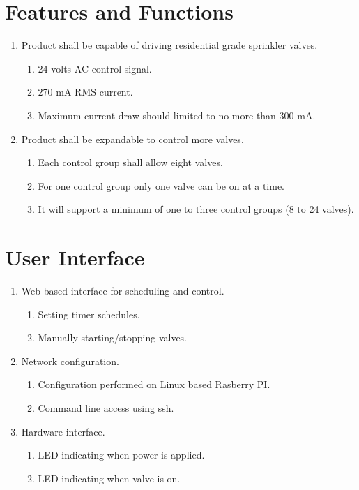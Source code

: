 \documentclass[12pt,letterpaper]{article}
\begin{document}

\pagebreak

\section{Features and Functions}

\begin{enumerate}
\item Product shall be capable of driving residential grade sprinkler valves.
	\begin{enumerate}
	\item 24 volts AC control signal.
	\item 270 mA RMS current.
	\item Maximum current draw should limited to no more than 300 mA.
	\end{enumerate}

\item Product shall be expandable to control more valves.
	\begin{enumerate}
	\item Each control group shall allow eight valves.
	\item For one control group only one valve can be on at a time.
	\item It will support a minimum of one to three control groups
		(8 to 24 valves).
	\end{enumerate}

\end{enumerate}

\section{User Interface}

\begin{enumerate}
\item Web based interface for scheduling and control.
	\begin{enumerate}
	\item Setting timer schedules.
	\item Manually starting/stopping valves.
	\end{enumerate}
\item Network configuration.
	\begin{enumerate}
	\item Configuration performed on Linux based Rasberry PI.
	\item Command line access using ssh.
	\end{enumerate}
\item Hardware interface.
	\begin{enumerate}
	\item LED indicating when power is applied.
	\item LED indicating when valve is on.
	\end{enumerate}
\end{enumerate}
\end{document}
